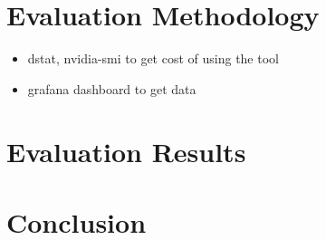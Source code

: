 \documentclass[conference]{IEEEtran}
\begin{document}
\section{Evaluation Methodology}

\begin{itemize}
    \item dstat, nvidia-smi to get cost of using the tool
    \item grafana dashboard to get data 
\end{itemize}

\section{Evaluation Results}

\section{Conclusion}
\end{document}
